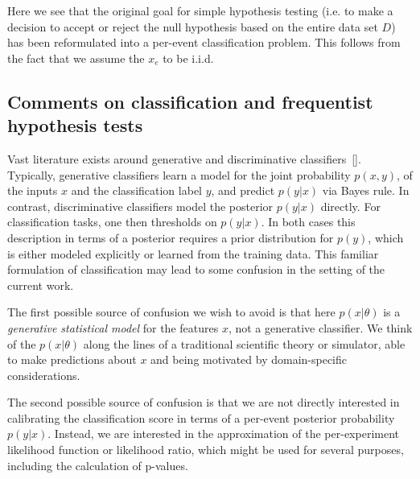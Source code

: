 \documentclass[aoas,preprint]{imsart}
\newcommand{\citek}[1]{[\cite{#1}]}
\numberwithin{equation}{section}
\theoremstyle{plain}
\begin{document}
Here we see that the original goal for simple hypothesis testing (i.e. to make a decision to accept or reject the null hypothesis based on the entire data set $D$) has been reformulated into a per-event classification problem. This follows from the fact that we assume the $x_e$ to be i.i.d.

\subsection{Comments on classification and frequentist hypothesis tests}

Vast literature exists around generative and discriminative classifiers~\citek{AndrewY.Ng}. Typically, generative classifiers learn a model for the joint probability $p(x,y)$, of the inputs $x$ and the classification label $y$, and predict $p(y|x)$ via Bayes rule. In contrast, discriminative classifiers model the posterior $p(y|x)$ directly. For classification tasks, one then thresholds on $p(y|x)$. In both cases this description in terms of a posterior requires a prior distribution for $p(y)$, which is either modeled explicitly or learned from the training data. 
This familiar formulation of classification may lead to some confusion in the setting of the current work. 

The first possible source of confusion we wish to avoid is that here $p(x|\theta)$  is a  \textit{generative statistical model} for the features $x$, not a generative classifier. We think of the  $p(x|\theta)$ along the lines of a traditional scientific theory or simulator, able to make predictions about $x$ and being motivated by domain-specific considerations. 

The second possible source of confusion is that 
we are not directly interested in calibrating the classification score in terms of a per-event posterior probability $p(y|x)$. 
Instead, we are interested in the approximation of the per-experiment likelihood function or likelihood ratio, which might be used for several purposes, including the calculation of p-values.
%
\end{document}

